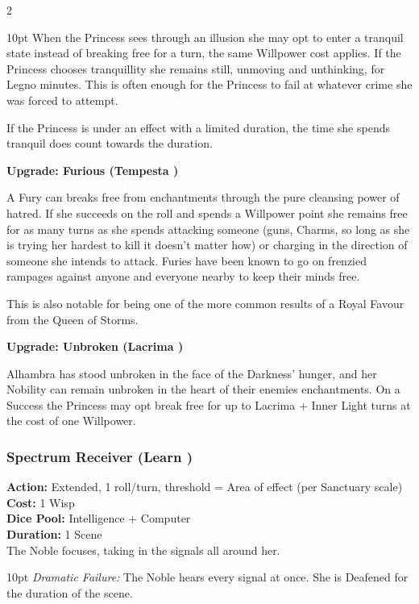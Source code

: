 \begin{multicols}{2}
\begin{myindentpar}{10pt}
When the Princess sees through an illusion she may opt to enter a tranquil state instead of breaking free for a turn, the same Willpower cost applies. If the Princess chooses tranquillity she remains still, unmoving and unthinking, for Legno minutes. This is often enough for the Princess to fail at whatever crime she was forced to attempt. 

If the Princess is under an effect with a limited duration, the time she spends tranquil does count towards the duration.

\textbf{Upgrade: Furious (Tempesta \textbullet\textbullet\textbullet)}

A Fury can breaks free from enchantments through the pure cleansing power of hatred. If she succeeds on the roll and spends a Willpower point she remains free for as many turns as she spends attacking someone (guns, Charms, so long as she is trying her hardest to kill it doesn't matter how) or charging in the direction of someone she intends to attack. Furies have been known to go on frenzied rampages against anyone and everyone nearby to keep their minds free.

This is also notable for being one of the more common results of a Royal Favour from the Queen of Storms. 

\textbf{Upgrade: Unbroken (Lacrima \textbullet\textbullet\textbullet\textbullet)}

Alhambra has stood unbroken in the face of the Darkness' hunger, and her Nobility can remain unbroken in the heart of their enemies enchantments. On a Success the Princess may opt break free for up to Lacrima + Inner Light turns at the cost of one Willpower. \end{myindentpar}

\subsubsection*{Spectrum Receiver (Learn \textbullet\textbullet)}
\noindent \textbf{Action:} Extended, 1 roll/turn, threshold = Area of effect (per Sanctuary scale)\\
\noindent \textbf{Cost:} 1 Wisp \\
\noindent \textbf{Dice Pool:} Intelligence + Computer\\
\noindent \textbf{Duration:} 1 Scene\\

\noindent The Noble focuses, taking in the signals all around her. 

\begin{myindentpar}{10pt}  \emph{Dramatic Failure:} The Noble hears every signal at once. She is Deafened for the duration of the scene.


\end{myindentpar}
\end{multicols}
